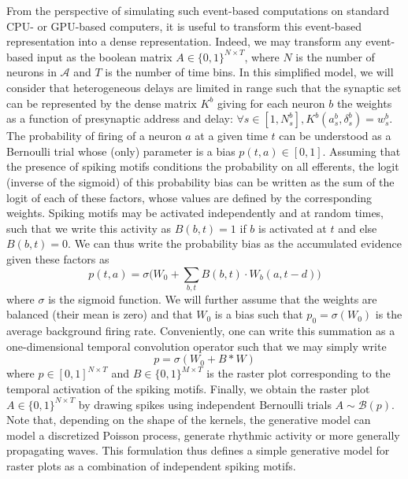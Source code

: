 \documentclass[runningheads]{llncs}
\newcommand{\presynaddr}{a} %
\newcommand{\postsynaddr}{b} %
\newcommand{\presynaddrspace}{\mathcal{A}} %
\newcommand{\synapticweight}{w} %
\newcommand{\synapticdelay}{\delta} %
\newcommand{\ranksyn}{s} %
\newcommand{\Nsyn}{N_{s}} %
\newcommand{\kernel}{K} %
\begin{document}
From the perspective of simulating such event-based computations on standard CPU- or GPU-based computers, it is useful to transform this event-based representation into a dense representation. Indeed, we may transform any event-based input as the boolean matrix $A \in \{0, 1 \}^{N\times T}$, where $N$ is the number of neurons in $\presynaddrspace$ and $T$ is the number of time bins. In this simplified model, we will consider that heterogeneous delays are limited in range such that the synaptic set can be represented by the dense matrix $\kernel^\postsynaddr$ giving for each neuron $\postsynaddr$ the weights as a function of presynaptic address and delay: $\forall {\ranksyn \in [1,\Nsyn^\postsynaddr]}, \kernel^\postsynaddr(\presynaddr_\ranksyn^\postsynaddr, \synapticdelay_\ranksyn^\postsynaddr) = \synapticweight_\ranksyn^\postsynaddr$. 
The probability of firing of a neuron $a$ at a given time $t$ can be understood as a Bernoulli trial whose (only) parameter is a bias $p(t, a) \in [0, 1]$. Assuming that the presence of spiking motifs conditions the probability on all efferents, the logit (inverse of the sigmoid) of this probability bias can be written as the sum of the logit of each of these factors, whose values are defined by the corresponding weights. Spiking motifs may be activated independently and at random times, such that  we write this activity as $B(b, t)=1$ if $b$ is activated at $t$ and else $B(b, t)=0$. We can thus write the probability bias as the accumulated evidence given these factors as 
\begin{equation*}
p(t, a) = \sigma\big(W_0 + \sum_{b, t} B(b, t) \cdot W_b(a, t-d) \big)  
\end{equation*}
where $\sigma$ is the sigmoid function. We will further assume that the weights are balanced (their mean is zero) and that $W_0$ is a bias such that $p_0=\sigma(W_0)$ is the average background firing rate. Conveniently, one can write this summation as a one-dimensional temporal convolution operator such that we may simply write
\begin{equation*}
p = \sigma(W_0 + B \ast W )
\end{equation*}
where  $p\in [ 0, 1]^{N\times T}$ and $B\in \{0, 1\}^{M\times T}$ is the raster plot corresponding to the temporal activation of the spiking motifs. Finally, we obtain the raster plot $A\in \{0, 1\}^{N\times T}$ by drawing spikes using independent Bernoulli trials $A \sim \mathcal{B}(p)$. Note that, depending on the shape of the kernels, the generative model can model a discretized Poisson process, generate rhythmic activity or more generally propagating waves. This formulation thus defines a simple generative model for raster plots as a combination of independent spiking motifs. 
\end{document}
